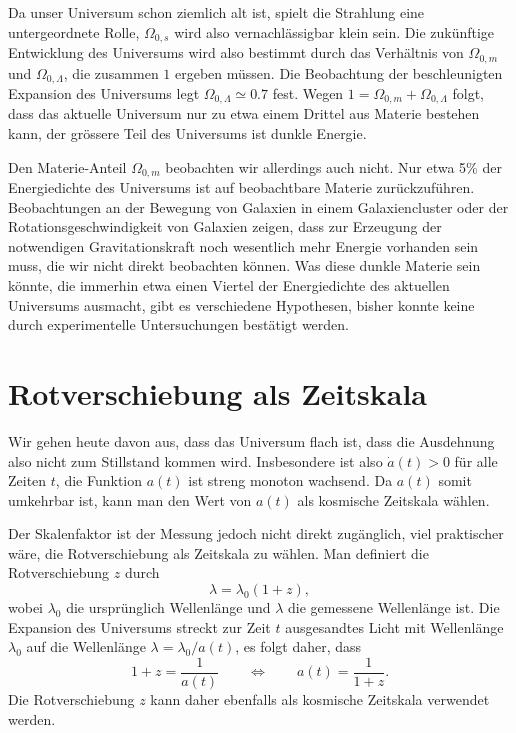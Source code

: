 Da unser Universum schon ziemlich alt ist, spielt die Strahlung
eine untergeordnete Rolle, $\Omega_{0,s}$ wird also vernachlässigbar
klein sein. 
Die zukünftige Entwicklung des Universums wird also bestimmt durch
das Verhältnis von $\Omega_{0,m}$ und $\Omega_{0,\Lambda}$, die
zusammen $1$ ergeben müssen.
Die Beobachtung der beschleunigten Expansion des Universums 
legt $\Omega_{0,\Lambda}\simeq 0.7$ fest.
Wegen $1=\Omega_{0,m}+\Omega_{0,\Lambda}$ folgt, dass das
aktuelle Universum nur zu etwa einem Drittel aus 
Materie bestehen kann, der grössere Teil des Universums ist
dunkle Energie.

Den Materie-Anteil $\Omega_{0,m}$ beobachten wir allerdings auch
nicht.
Nur etwa 5\% der Energiedichte des Universums ist auf beobachtbare
Materie zurückzuführen.
Beobachtungen an der Bewegung von Galaxien in einem Galaxiencluster
oder der Rotationsgeschwindigkeit von Galaxien zeigen, dass zur Erzeugung
der notwendigen Gravitationskraft noch wesentlich mehr Energie vorhanden
sein muss, die wir nicht direkt beobachten können.
Was diese dunkle Materie sein könnte, die immerhin etwa einen Viertel der
Energiedichte des aktuellen Universums ausmacht, gibt es verschiedene
Hypothesen, bisher konnte keine durch experimentelle Untersuchungen
bestätigt werden.

\section{Rotverschiebung als Zeitskala%
\label{skript:section:rotverschiebung}}
Wir gehen heute davon aus, dass das Universum flach ist, dass die
Ausdehnung also nicht zum Stillstand kommen wird.
Insbesondere ist also $\dot a(t)>0$ für alle Zeiten $t$, die Funktion
$a(t)$ ist streng monoton wachsend.
Da $a(t)$ somit umkehrbar ist, kann man den Wert von $a(t)$ als kosmische
Zeitskala wählen.
%


Der Skalenfaktor ist der Messung jedoch nicht direkt zugänglich,
viel praktischer wäre, die Rotverschiebung als Zeitskala zu wählen.
Man definiert die Rotverschiebung $z$ durch
\[
\lambda = \lambda_0(1+z),
\]
wobei $\lambda_0$ die ursprünglich Wellenlänge und $\lambda$ die
gemessene Wellenlänge ist.
Die Expansion des Universums streckt zur Zeit $t$ ausgesandtes Licht mit
Wellenlänge $\lambda_0$ auf die Wellenlänge $\lambda=\lambda_0/a(t)$,
es folgt daher, dass
\[
1+z=\frac{1}{a(t)}
\qquad\Leftrightarrow\qquad
a(t)=\frac1{1+z}.
\]
Die Rotverschiebung $z$ kann daher ebenfalls als kosmische Zeitskala 
verwendet werden.

